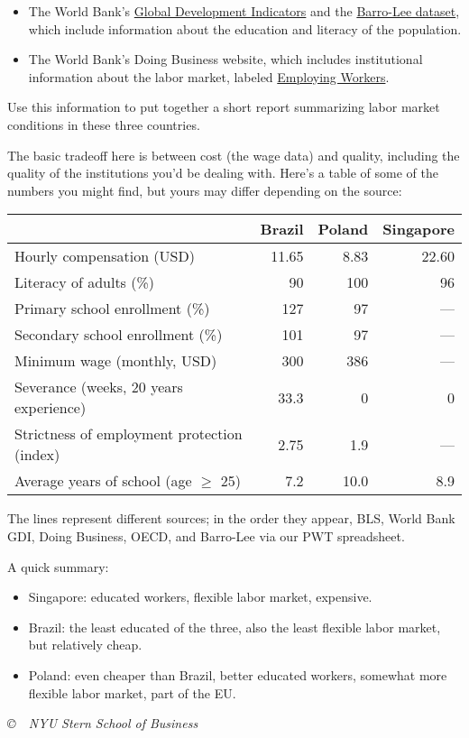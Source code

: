 \documentclass[12pt]{exam}
\begin{document}
\begin{questions}
\begin{itemize}
\item The World Bank's
\href{http://data.worldbank.org/topic}{Global Development Indicators}
and the
\href{http://www.barrolee.com/}{Barro-Lee dataset},
which include
information about the education and literacy of the population.

\item The World Bank's Doing Business website, which includes
institutional information about the labor market,
labeled
\href{http://www.doingbusiness.org/data/exploretopics/employing-workers}
{Employing Workers}.

\end{itemize}
%
Use this information to put together a short report
summarizing labor market conditions in these three countries.


\begin{solution}
The basic tradeoff here is between cost (the wage data)
and quality, including the quality of the institutions
you'd be dealing with.
Here's a table of some of the numbers you might find,
but yours may differ depending on the source:

\begin{center}
\begin{tabular}{lrrr}
\toprule
		& Brazil & Poland  & Singapore  \\
\midrule
Hourly compensation (USD)   & 11.65  & 8.83 & 22.60 \\
\midrule
Literacy of adults  (\%)    &  90 & 100 & 96 \\
Primary school enrollment (\%) & 127 & 97 & --- \\
Secondary school enrollment (\%) & 101 & 97 & --- \\
\midrule
Minimum wage (monthly, USD) & 300 & 386 & --- \\
Severance (weeks, 20 years experience)
                    & 33.3 & 0  & 0 \\
\midrule
Strictness of employment protection (index)
                & 2.75 & 1.9 & --- \\
\midrule
Average years of school (age $\geq$ 25) & 7.2 & 10.0 & 8.9 \\
\bottomrule
\end{tabular}
\end{center}

The lines represent different sources;
in the order they appear,
BLS, World Bank GDI, Doing Business, OECD,
and Barro-Lee via our PWT spreadsheet.

A quick summary:
\begin{itemize}
\item Singapore:  educated workers, flexible labor market, expensive.
\item Brazil:  the least educated of the three, also the least flexible labor market,
but relatively cheap.
\item Poland:  even cheaper than Brazil, better educated workers,
somewhat more flexible labor market, part of the EU.
\end{itemize}

\end{solution}


\end{questions}

\vfill \centerline{\it \copyright \ \number\year \
NYU Stern School of Business}
\end{document}
